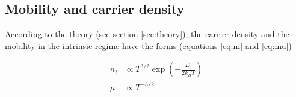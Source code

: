 \documentclass[a4paper]{article}
\begin{document}

\subsection{Mobility and carrier density}

According to the theory (see section \ref{sec:theory}), the carrier density and the mobility in the intrinsic regime have the forms (equations \eqref{eq:ni} and \eqref{eq:mu})

\begin{subequations}
\begin{align}
n_i &\propto T^{3/2} \exp{\left( -\frac{E_g}{2 k_B T} \right)} \\
\mu &\propto T^{-3/2}
\end{align}
\end{subequations}
\end{document}
